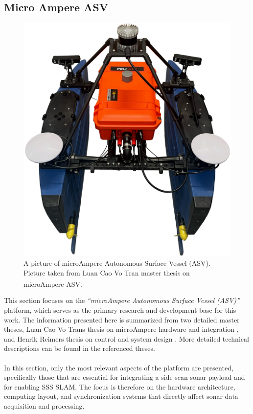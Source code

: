 \subsection{Micro Ampere ASV}
\begin{figure}[H]
    \centering
    \includegraphics[width=0.6\linewidth]{Pictures/Hardware/microAmpere_ASV/microAmpere_ASV.png}
    \caption{A picture of microAmpere Autonomous Surface Vessel (ASV). Picture taken from Luan Cao Vo Tran master thesis on microAmpere ASV.\textsuperscript{\cite{microAmpere_hardware_master_thesis1}}}
    \label{fig:microAmpere}
\end{figure}
\noindent
This section focuses on the \textit{``microAmpere Autonomous Surface Vessel (ASV)''} platform, which serves as the primary research and development base for this work. The information presented here is summarized from two detailed master theses, Luan Cao Vo Trans thesis on microAmpere hardware and integration \cite{microAmpere_hardware_master_thesis1}, and Henrik Reimers thesis on control and system design \cite{microAmpere_hardware_master_thesis2}. More detailed technical descriptions can be found in the referenced theses.
\\ \\
In this section, only the most relevant aspects of the platform are presented, specifically those that are essential for integrating a side scan sonar payload and for enabling SSS SLAM. The focus is therefore on the hardware architecture, computing layout, and synchronization systems that directly affect sonar data acquisition and processing.
